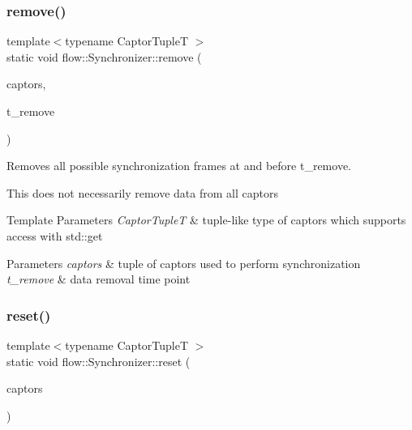 \subsubsection{\texorpdfstring{remove()}{remove()}}
{\footnotesize\ttfamily template$<$typename Captor\+TupleT $>$ \\
static void flow\+::\+Synchronizer\+::remove (\begin{DoxyParamCaption}\item[{Captor\+TupleT \&\&}]{captors,  }\item[{const \hyperlink{classflow_1_1_synchronizer_a0f1e7062475c9492191e29b26d09106c}{stamp\+\_\+arg\+\_\+t}$<$ Captor\+TupleT $>$}]{t\+\_\+remove }\end{DoxyParamCaption})\hspace{0.3cm}{\ttfamily [static]}}



Removes all possible synchronization frames at and before {\ttfamily t\+\_\+remove}. 

This does not necessarily remove data from all captors


\begin{DoxyTemplParams}{Template Parameters}
{\em Captor\+TupleT} & tuple-\/like type of captors which supports access with {\ttfamily std\+::get}\\
\hline
\end{DoxyTemplParams}

\begin{DoxyParams}{Parameters}
{\em captors} & tuple of captors used to perform synchronization \\
\hline
{\em t\+\_\+remove} & data removal time point \\
\hline
\end{DoxyParams}
\mbox{\label{classflow_1_1_synchronizer_aa598f6976190683afff9c6e45b2e5884}} 
\subsubsection{\texorpdfstring{reset()}{reset()}}
{\footnotesize\ttfamily template$<$typename Captor\+TupleT $>$ \\
static void flow\+::\+Synchronizer\+::reset (\begin{DoxyParamCaption}\item[{Captor\+TupleT \&\&}]{captors }\end{DoxyParamCaption})\hspace{0.3cm}{\ttfamily [static]}}



